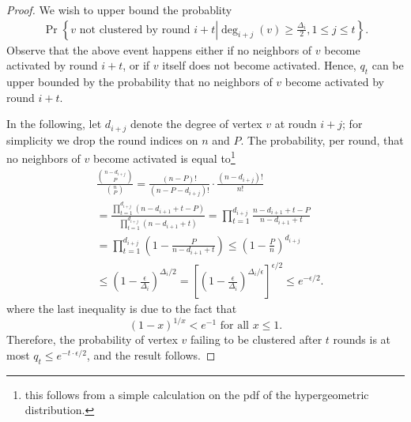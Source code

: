 \documentclass{article} %
\begin{document}
\begin{proof}
We wish to upper bound the probablity
{\small 
\begin{align*}
\Pr\left\{\text{$v$ not clustered by round $i+t$}\left| \deg_{i+j}(v) \ge \frac{\Delta_i}{2}, 1\le j\le t \right.\right\}.
\end{align*}
}Observe that the above event happens either if no neighbors of $v$ become activated by round $i+t$, or if $v$ itself does not become activated.
Hence, $q_t$ can be upper bounded by the probability that no neighbors of $v$ become activated by round $i+t$.

In the following, let $d_{i+j}$ denote the degree of vertex $v$ at roudn $i+j$;
for simplicity we drop the round indices on $n$ and $P$.
The probability, per round, that no neighbors of $v$ become activated is equal to\footnote{this follows from a simple calculation on the pdf of the hypergeometric distribution.}
\begin{align*}
&\frac{{n-d_{i+j}\choose P}}{{n\choose P}}
= \frac{ (n-P)!}{ (n-P-d_{i+j})! }\cdot \frac{(n-d_{i+j})!}{n!}\\
&= \frac{\prod_{t=1}^{d_{i+j}}(n-d_{i+1}+t-P)}{\prod_{t=1}^{d_{i+j}}(n-d_{i+1}+t)}= \prod_{t=1}^{d_{i+j}} \frac{n-d_{i+1}+t-P}{n-d_{i+1}+t}\\
&= \prod_{t=1}^{d_{i+j}}\left(1- \frac{P}{n-d_{i+1}+t}\right)\le \left(1- \frac{P}{n}\right)^{d_{i+j}}\\
&\le \left(1- \frac{\epsilon}{\Delta_i}\right)^{\Delta_i/2}= \left[\left(1- \frac{\epsilon}{\Delta_i}\right)^{\Delta_i/\epsilon}\right]^{\epsilon/2}
\le e^{-\epsilon/2}.
\end{align*}
where the last inequality is due to the fact that 
$$(1-x)^{1/x}<e^{-1}\text{ for all }x\le 1.$$
Therefore, the probability of vertex $v$ failing to be clustered after $t$ rounds is at most
$q_t\le e^{-t\cdot \epsilon /2}$,
and the result follows.
\end{proof}
\end{document}
